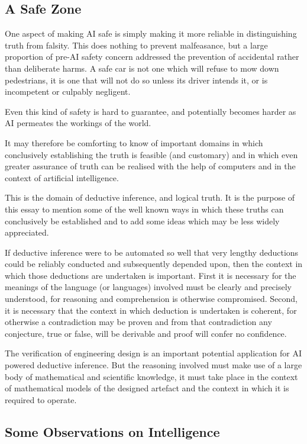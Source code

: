 \documentclass[10pt,titlepage]{book}
\begin{document}
\subsection{A Safe Zone}

One aspect of making AI safe is simply making it more reliable in distinguishing truth from falsity.
This does nothing to prevent malfeasance, but a large proportion of pre-AI safety concern addressed the prevention of accidental rather than deliberate harms.
A safe car is not one which will refuse to mow down pedestrians, it is one that will not do so unless its driver intends it, or is incompetent or culpably negligent.

Even this kind of safety is hard to guarantee, and potentially becomes harder as AI permeates the workings of the world.

It may therefore be comforting to know of important domains in which conclusively establishing the truth is feasible (and customary) and in which even greater assurance of truth can be realised with the help of computers and in the context of artificial intelligence.

This is the domain of deductive inference, and logical truth.
It is the purpose of this essay to mention some of the well known ways in which these truths can conclusively be established and to add some ideas which may be less widely appreciated.

If deductive inference were to be automated so well that very lengthy deductions could be reliably conducted and subsequently depended upon, then the context in which those deductions are undertaken is important.
First it is necessary for the meanings of the language (or languages) involved must be clearly and precisely understood, for reasoning and comprehension is otherwise compromised.
Second, it is necessary that the context in which deduction is undertaken is coherent, for otherwise a contradiction may be proven and from that contradiction any conjecture, true or false, will be derivable and proof will confer no confidence.

The verification of engineering design is an important potential application for AI powered deductive inference.
But the reasoning involved must make use of a large body of mathematical and scientific knowledge, it must take place in the context of 
mathematical models of the designed artefact and the context in which it is required to operate.


\subsection{Some Observations on Intelligence}
\end{document}
